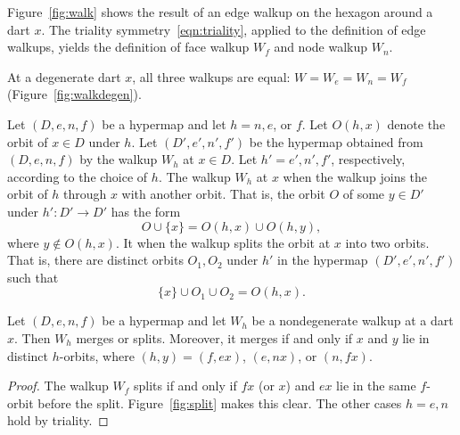 Figure~\ref{fig:walk} shows
the result of an edge walkup on the hexagon around a dart $x$.
The triality symmetry~\ref{eqn:triality}, applied to the definition
of edge walkups, yields the definition of
face walkup $W_f$ and node walkup $W_n$.  

At a degenerate dart $x$, all three walkups are equal: $W=W_e=W_n=W_f$
(Figure~\ref{fig:walkdegen}).  %
%

\figGFJIBZV  %

\figLNIZBPW %


\begin{definition}\label{def:merge-split} 
Let $(D,e,n,f)$ be a hypermap and
  let $h=n,e$, or $f$.  Let $O(h,x)$ denote the orbit of
  $x\in D$ under $h$.  Let $(D',e',n',f')$ be the hypermap obtained
  from $(D,e,n,f)$ by the walkup $W_h$ at $x\in D$.  Let
  $h'=e',n',f'$, respectively, according to the choice of $h$.  The
  walkup $W_h$ at $x$  when the walkup joins the orbit
  of $h$ through $x$ with another orbit.  That is, the orbit $O$ of
  some $y\in D'$ under $h':D'\to D'$ has the form
\[ 
  O \cup\{x\} = O(h,x) \cup O(h,y),
\] 
where $y\not\in O(h,x)$.  It  when the walkup
splits the orbit at $x$ into two orbits.  That is, there are distinct
orbits $O_1,O_2$ under $h'$ in the hypermap $(D',e',n',f')$ such that
\[ 
  \{x\}\cup O_1\cup O_2 = O(h,x).
\] 
%
%
\end{definition}

\begin{lemma}\label{lemma:merge-split} 
  Let $(D,e,n,f)$ be a hypermap and let $W_h$ be a nondegenerate
  walkup at a dart $x$.  Then $W_h$ merges or splits. Moreover, it merges if
  and only if $x$ and $y$ lie in distinct $h$-orbits, where
  $(h,y)=(f,e x)$,  $(e,n x)$, or $(n,f x)$.
\end{lemma}

\begin{proof} The walkup $W_f$ splits if and only if $f x$ 
(or $x$)
and $e x$ lie in the same $f$-orbit before the split. 
Figure~\ref{fig:split} makes this clear.
The other cases $h=e,n$ hold by triality.
\end{proof}


